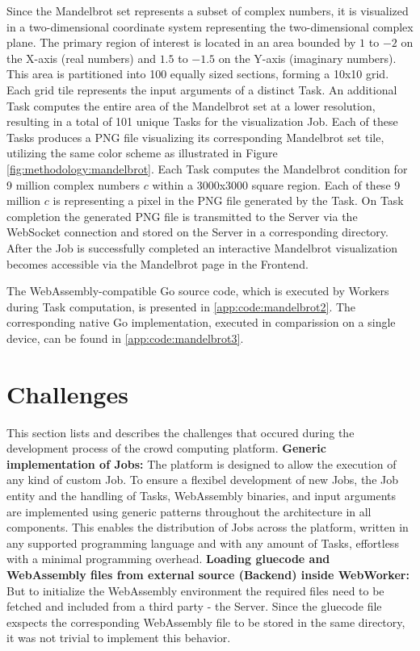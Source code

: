 Since the Mandelbrot set represents a subset of complex numbers, it is visualized in a two-dimensional coordinate system representing the two-dimensional complex plane. The primary region of interest is located in an area bounded by $1$ to $-2$ on the X-axis (real numbers) and $1.5$ to $-1.5$ on the Y-axis (imaginary numbers). This area is partitioned into 100 equally sized sections, forming a 10x10 grid. Each grid tile represents the input arguments of a distinct Task. An additional Task computes the entire area of the Mandelbrot set at a lower resolution, resulting in a total of 101 unique Tasks for the visualization Job. Each of these Tasks produces a \ac{PNG} file visualizing its corresponding Mandelbrot set tile, utilizing the same color scheme as illustrated in Figure \ref{fig:methodology:mandelbrot}. Each Task computes the Mandelbrot condition for 9 million complex numbers $c$ within a 3000x3000 square region. Each of these 9 million $c$ is representing a pixel in the \ac{PNG} file generated by the Task. On Task completion the generated \ac{PNG} file is transmitted to the Server via the WebSocket connection and stored on the Server in a corresponding directory. After the Job is successfully completed an interactive Mandelbrot visualization becomes accessible via the Mandelbrot page in the Frontend.

The WebAssembly-compatible Go source code, which is executed by Workers during Task computation, is presented in \ref{app:code:mandelbrot2}. The corresponding native Go implementation, executed in comparission on a single device, can be found in \ref{app:code:mandelbrot3}.

\section{Challenges}
\label{sec:implementation:challenges}
This section lists and describes the  challenges that occured during the development process of the crowd computing platform.
\newline
\newline
\textbf{Generic implementation of Jobs:}
\newline
The platform is designed to allow the execution of any kind of custom Job. To ensure a flexibel development of new Jobs, the Job entity and the handling of Tasks, WebAssembly binaries, and input arguments are implemented using generic patterns throughout the architecture in all components. This enables the distribution of Jobs across the platform, written in any supported programming language and with any amount of Tasks, effortless with a minimal programming overhead.
\newline
\newline
\textbf{Loading gluecode and WebAssembly files from external source (Backend) inside WebWorker:}
\newline
But to initialize the WebAssembly environment the required files need to be fetched and included from a third party - the Server. Since the gluecode file exspects the corresponding WebAssembly file to be stored in the same directory, it was not trivial to implement this behavior.

